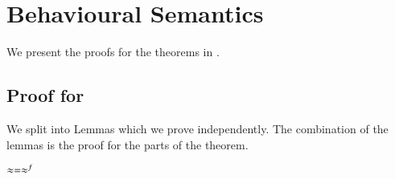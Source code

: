 \section{Behavioural Semantics}

We present the proofs for the theorems in
.

\subsection{Proof for }
\label{app:sub_coinc}

We split  into 
Lemmas which we prove independently.
The combination of the lemmas is the proof for the parts
of the theorem.



\begin{lemma}\rm
	\label{lem:wb_eq_wbf}
	$\approx = \approx^{f}$
\end{lemma}

